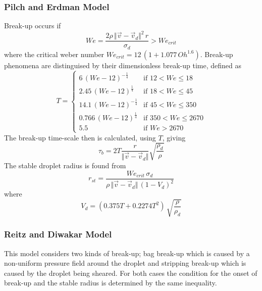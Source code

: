 \documentclass[a4paper,10pt]{article}
\begin{document}
\subsubsection{Pilch and Erdman Model}
Break-up occurs if
\begin{equation}
We = \frac{2 \rho \, \Vert\vec{v}-\vec{v}_{d}\Vert^2 \, r}{\sigma_d} > We_{crit}
\end{equation}
where the critical weber number $We_{crit} = 12 \, (1+1.077 \, Oh^{1.6})$.  Break-up phenomena are distinguised by their dimensionless break-up time, defined as
\begin{equation}
T =
\begin{cases}
6 \, (We-12)^{-\frac{1}{4}} & \text{if $12 < We \leq 18$} \\
2.45 \, (We-12)^{\frac{1}{4}} & \text{if $18 < We \leq 45$} \\
14.1 \, (We-12)^{-\frac{1}{4}} & \text{if $45 < We \leq 350$} \\
0.766 \, (We-12)^{\frac{1}{4}} & \text{if $350 < We \leq 2670$} \\
5.5 & \text{if $We > 2670$}
\end{cases}
\end{equation}
The break-up time-scale then is calculated, using $T$, giving
\begin{equation}
\tau_b = 2 T \frac{r}{\Vert\vec{v}-\vec{v}_{d}\Vert} \sqrt{\frac{\rho_d}{\rho}}
\end{equation}
The stable droplet radius is found from
\begin{equation}
r_{st} = \frac{We_{crit} \, \sigma_d}{\rho \, \Vert\vec{v}-\vec{v}_{d}\Vert \, (1-V_d)^2}
\end{equation}
where
\begin{equation}
V_d = (0.375T + 0.2274T^2) \, \sqrt{\frac{\rho}{\rho_d}}
\end{equation}



\subsubsection{Reitz and Diwakar Model}
This model considers two kinds of break-up; bag break-up which is caused by a non-uniform pressure field around the droplet and stripping break-up which is caused by the droplet being sheared.  For both cases the condition for the onset of break-up and the stable radius is determined by the same inequality.
\end{document}
